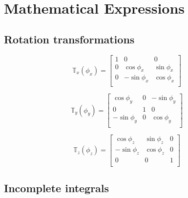 
\section{Mathematical Expressions\label{app:a}}

\subsection{Rotation transformations\label{appendix:rotational_transformations}}

\begin{equation}
    \mathbb{T}_x(\phi_x)=
    \begin{bmatrix}
        1 & 0 & 0 \\
        0 & \cos\phi_x & \sin\phi_x \\
        0 & -\sin\phi_x & \cos\phi_x \\
    \end{bmatrix}
\end{equation}

\begin{equation}
    \mathbb{T}_y(\phi_y)=
    \begin{bmatrix}
        \cos\phi_y  & 0 & -\sin\phi_y  \\
        0           & 1 & 0            \\
        -\sin\phi_y & 0 & \cos\phi_y   \\
    \end{bmatrix}
\end{equation}

\begin{equation}
    \mathbb{T}_z(\phi_z)=
    \begin{bmatrix}
         \cos\phi_z & \sin\phi_z & 0 \\
        -\sin\phi_z & \cos\phi_z & 0 \\
        0           & 0          & 1 \\
    \end{bmatrix}
\end{equation}

\subsection{Incomplete integrals\label{appendix:incomplete_integrals}}

